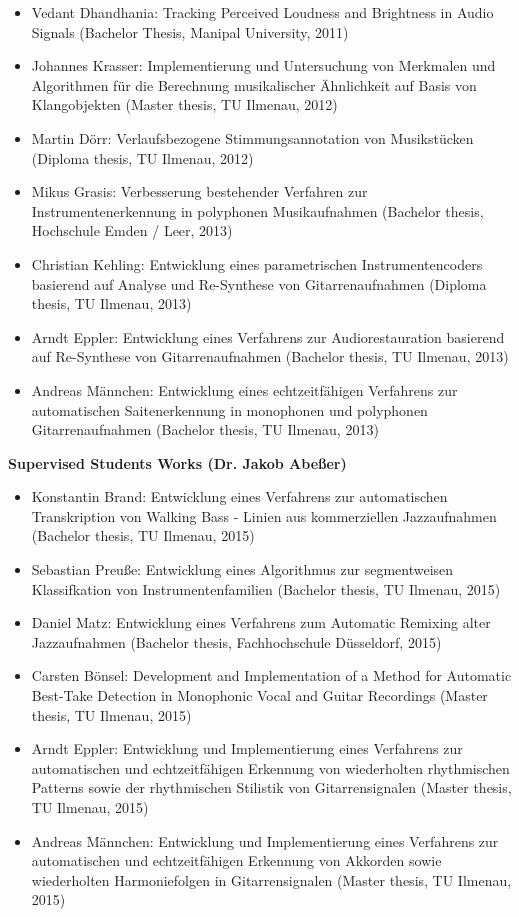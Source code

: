 \documentclass[8pt,a4paper]{article}
\newenvironment{itemizePacked}{
\begin{itemize}
  \setlength{\itemsep}{1pt}
  \setlength{\parskip}{3pt}
  \setlength{\parsep}{0pt}
  \renewcommand{\labelitemi}{$\bullet$}
}{\end{itemize}}
\begin{document}
\begin{itemizePacked}
\item Vedant Dhandhania: Tracking Perceived Loudness and Brightness in Audio Signals (Bachelor Thesis, Manipal University, 2011)
\item Johannes Krasser: Implementierung und Untersuchung von Merkmalen und Algorithmen f\"ur die Berechnung musikalischer Ähnlichkeit auf Basis von Klangobjekten (Master thesis, TU Ilmenau, 2012)
\item Martin D\"orr: Verlaufsbezogene Stimmungsannotation von Musikst\"ucken (Diploma thesis, TU Ilmenau, 2012)
\item Mikus Grasis: Verbesserung bestehender Verfahren zur Instrumentenerkennung in polyphonen
Musikaufnahmen (Bachelor thesis, Hochschule Emden / Leer, 2013)
\item Christian Kehling: Entwicklung eines parametrischen Instrumentencoders basierend auf Analyse und Re-Synthese von Gitarrenaufnahmen (Diploma thesis, TU Ilmenau, 2013)
\item Arndt Eppler: Entwicklung eines Verfahrens zur Audiorestauration basierend auf Re-Synthese von Gitarrenaufnahmen (Bachelor thesis, TU Ilmenau, 2013)
\item Andreas M\"annchen: Entwicklung eines echtzeitf\"ahigen Verfahrens zur automatischen Saitenerkennung in monophonen und polyphonen Gitarrenaufnahmen (Bachelor thesis, TU Ilmenau, 2013)
\end{itemizePacked}
\pagebreak

{\bf Supervised Students Works  (Dr. Jakob Abe{\ss}er)}

\begin{itemizePacked}
\item Konstantin Brand: Entwicklung eines Verfahrens zur automatischen Transkription von Walking Bass - Linien aus kommerziellen Jazzaufnahmen (Bachelor thesis, TU Ilmenau, 2015)
\item Sebastian Preu{\ss}e: Entwicklung eines Algorithmus zur segmentweisen Klassifkation von Instrumentenfamilien (Bachelor thesis, TU Ilmenau, 2015)
\item Daniel Matz: Entwicklung eines Verfahrens zum Automatic Remixing alter Jazzaufnahmen (Bachelor thesis, Fachhochschule D\"usseldorf, 2015)
\item Carsten B\"onsel: Development and Implementation of a Method for Automatic Best-Take Detection in Monophonic Vocal and Guitar Recordings (Master thesis, TU Ilmenau, 2015)
\item Arndt Eppler: Entwicklung und Implementierung eines Verfahrens zur automatischen und echtzeitf\"ahigen Erkennung von wiederholten rhythmischen Patterns sowie der rhythmischen Stilistik von Gitarrensignalen (Master thesis, TU Ilmenau, 2015)
\item Andreas M\"annchen: Entwicklung und Implementierung eines Verfahrens zur automatischen und echtzeitf\"ahigen Erkennung von Akkorden sowie wiederholten Harmoniefolgen in Gitarrensignalen (Master thesis, TU Ilmenau, 2015)
\end{itemizePacked}
%
\end{document}
